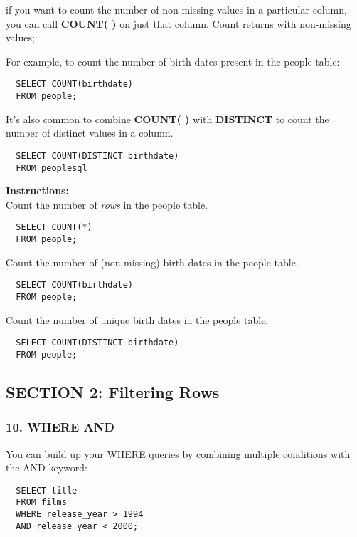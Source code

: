 \documentclass[
]{article}
\begin{document}
if you want to count the number of non-missing values in a particular
column, you can call \textbf{COUNT( )} on just that column. Count
returns with non-missing values;

For example, to count the number of birth dates present in the people
table:

\begin{verbatim}
  SELECT COUNT(birthdate)
  FROM people;
\end{verbatim}

It's also common to combine \textbf{COUNT( )} with \textbf{DISTINCT} to
count the number of distinct values in a column.

\begin{verbatim}
  SELECT COUNT(DISTINCT birthdate)
  FROM peoplesql
\end{verbatim}

\textbf{Instructions:}\\
Count the number of \emph{rows} in the people table.

\begin{verbatim}
  SELECT COUNT(*)
  FROM people;
\end{verbatim}

Count the number of (non-missing) birth dates in the people table.

\begin{verbatim}
  SELECT COUNT(birthdate)
  FROM people;
\end{verbatim}

Count the number of unique birth dates in the people table.

\begin{verbatim}
  SELECT COUNT(DISTINCT birthdate)
  FROM people;
\end{verbatim}

\hypertarget{section-2-filtering-rows}{%
\subsection{SECTION 2: Filtering Rows}\label{section-2-filtering-rows}}

\hypertarget{where-and}{%
\subsubsection{10. WHERE AND}\label{where-and}}

You can build up your WHERE queries by combining multiple conditions
with the AND keyword:

\begin{verbatim}
  SELECT title
  FROM films
  WHERE release_year > 1994
  AND release_year < 2000;
\end{verbatim}
\end{document}

